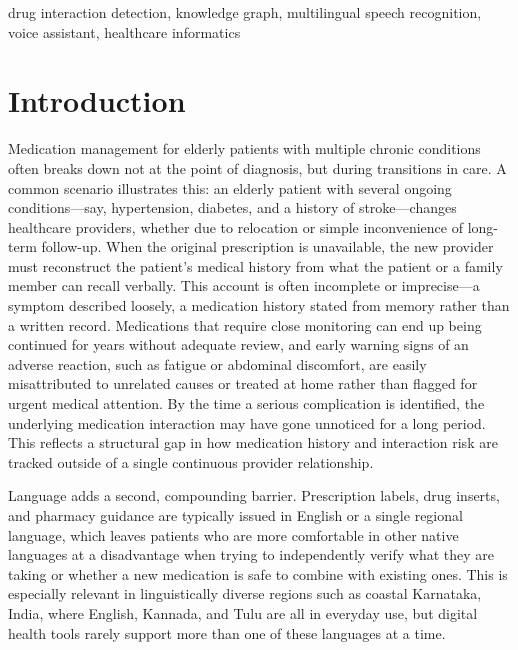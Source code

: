 \documentclass[9pt,journal,twoside,web]{ieeecolor}
\begin{document}
\begin{IEEEkeywords}
drug interaction detection, knowledge graph, multilingual speech recognition, voice assistant, healthcare informatics
\end{IEEEkeywords}

\section{Introduction}
\label{sec:introduction}
Medication management for elderly patients with multiple chronic conditions often breaks down not at the point of diagnosis, but during transitions in care. A common scenario illustrates this: an elderly patient with several ongoing conditions---say, hypertension, diabetes, and a history of stroke---changes healthcare providers, whether due to relocation or simple inconvenience of long-term follow-up. When the original prescription is unavailable, the new provider must reconstruct the patient's medical history from what the patient or a family member can recall verbally. This account is often incomplete or imprecise---a symptom described loosely, a medication history stated from memory rather than a written record. Medications that require close monitoring can end up being continued for years without adequate review, and early warning signs of an adverse reaction, such as fatigue or abdominal discomfort, are easily misattributed to unrelated causes or treated at home rather than flagged for urgent medical attention. By the time a serious complication is identified, the underlying medication interaction may have gone unnoticed for a long period. This reflects a structural gap in how medication history and interaction risk are tracked outside of a single continuous provider relationship.

Language adds a second, compounding barrier. Prescription labels, drug inserts, and pharmacy guidance are typically issued in English or a single regional language, which leaves patients who are more comfortable in other native languages at a disadvantage when trying to independently verify what they are taking or whether a new medication is safe to combine with existing ones. This is especially relevant in linguistically diverse regions such as coastal Karnataka, India, where English, Kannada, and Tulu are all in everyday use, but digital health tools rarely support more than one of these languages at a time.
\end{document}
